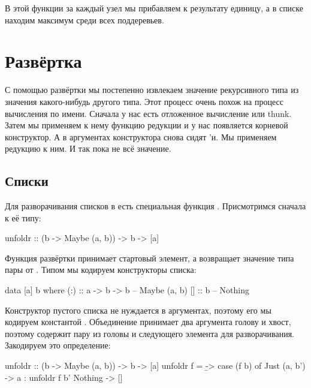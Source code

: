 
В этой функции за каждый узел мы прибавляем к результату
единицу, а в списке находим максимум среди всех поддеревьев. 

\section{Развёртка}

С помощью развёртки мы постепенно извлекаем значение
рекурсивного типа из значения какого-нибудь другого типа.
Этот процесс очень похож на процесс вычисления по имени.
Сначала у нас есть отложенное вычисление или thunk. 
Затем мы применяем к нему функцию редукции и у нас появляется 
корневой конструктор.
А в аргументах конструктора снова сидят 'и. Мы применяем
редукцию к ним. И так пока не  всё значение.

\subsection{Списки}

Для разворачивания списков в  есть специальная
функция . Присмотримся сначала к её типу:

\begin{code}
unfoldr :: (b -> Maybe (a, b)) -> b -> [a]
\end{code}

Функция развёртки принимает стартовый элемент, а возвращает
значение типа пары от . Типом  мы кодируем 
конструкторы списка:

\begin{code}
data [a] b where
    (:)  :: a -> b -> b     -- Maybe (a, b)
    []   :: b               -- Nothing
\end{code}

Конструктор пустого списка не нуждается в аргументах, поэтому
его мы кодируем константой . Объединение принимает
два аргумента голову и хвост, поэтому  содержит пару
из головы и следующего элемента для разворачивания.
Закодируем это определение:

\begin{code}
unfoldr :: (b -> Maybe (a, b)) -> b -> [a]
unfoldr f = \b -> case (f b) of
    Just (a, b') -> a : unfoldr f b'
    Nothing      -> []
\end{code}

